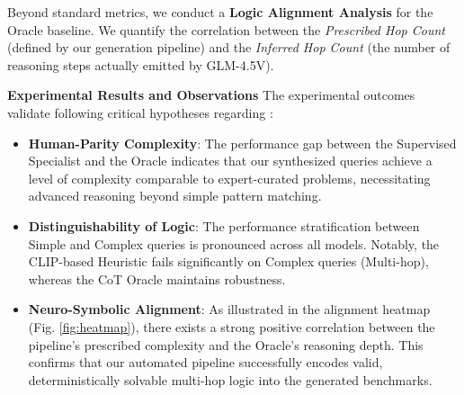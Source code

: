 Beyond standard metrics, we conduct a \textbf{Logic Alignment Analysis} for the Oracle baseline. We quantify the correlation between the \textit{Prescribed Hop Count} (defined by our generation pipeline) and the \textit{Inferred Hop Count} (the number of reasoning steps actually emitted by GLM-4.5V).

\textbf{Experimental Results and Observations} 
The experimental outcomes validate following critical hypotheses regarding \BenchmarkName:
\begin{itemize}
    \item \textbf{Human-Parity Complexity}: The performance gap between the Supervised Specialist and the Oracle indicates that our synthesized queries achieve a level of complexity comparable to expert-curated problems, necessitating advanced reasoning beyond simple pattern matching.
    \item \textbf{Distinguishability of Logic}: The performance stratification between Simple and Complex queries is pronounced across all models. Notably, the CLIP-based Heuristic fails significantly on Complex queries (Multi-hop), whereas the CoT Oracle maintains robustness.
    \item \textbf{Neuro-Symbolic Alignment}: As illustrated in the alignment heatmap (Fig. \ref{fig:heatmap}), there exists a strong positive correlation between the pipeline's prescribed complexity and the Oracle's reasoning depth. This confirms that our automated pipeline successfully encodes valid, deterministically solvable multi-hop logic into the generated benchmarks.
\end{itemize}
